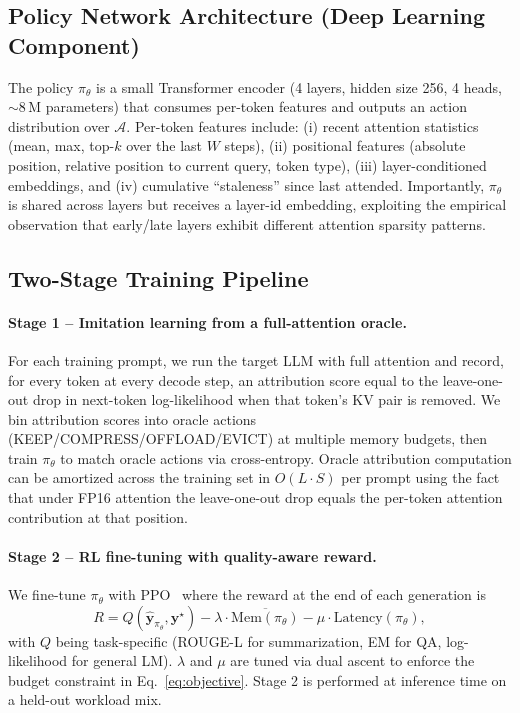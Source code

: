 \documentclass[journal]{IEEEtran}
\begin{document}
\subsection{Policy Network Architecture (Deep Learning Component)}
The policy $\pi_\theta$ is a small Transformer encoder (4 layers, hidden size 256, 4 heads, $\sim 8$\,M parameters) that consumes per-token features and outputs an action distribution over $\mathcal{A}$. Per-token features include: (i) recent attention statistics (mean, max, top-$k$ over the last $W$ steps), (ii) positional features (absolute position, relative position to current query, token type), (iii) layer-conditioned embeddings, and (iv) cumulative ``staleness'' since last attended. Importantly, $\pi_\theta$ is shared across layers but receives a layer-id embedding, exploiting the empirical observation that early/late layers exhibit different attention sparsity patterns.

\subsection{Two-Stage Training Pipeline}
\paragraph{Stage 1 -- Imitation learning from a full-attention oracle.} For each training prompt, we run the target LLM with full attention and record, for every token at every decode step, an attribution score equal to the leave-one-out drop in next-token log-likelihood when that token's KV pair is removed. We bin attribution scores into oracle actions (KEEP/COMPRESS/OFFLOAD/EVICT) at multiple memory budgets, then train $\pi_\theta$ to match oracle actions via cross-entropy. Oracle attribution computation can be amortized across the training set in $O(L \cdot S)$ per prompt using the fact that under FP16 attention the leave-one-out drop equals the per-token attention contribution at that position.

\paragraph{Stage 2 -- RL fine-tuning with quality-aware reward.} We fine-tune $\pi_\theta$ with PPO~\cite{schulman2017ppo} where the reward at the end of each generation is
\begin{equation}
R = Q(\hat{\mathbf{y}}_{\pi_\theta},\mathbf{y}^\star) - \lambda \cdot \overline{\mathrm{Mem}(\pi_\theta)} - \mu\cdot \mathrm{Latency}(\pi_\theta),
\label{eq:reward}
\end{equation}
with $Q$ being task-specific (ROUGE-L for summarization, EM for QA, log-likelihood for general LM). $\lambda$ and $\mu$ are tuned via dual ascent to enforce the budget constraint in Eq.~\ref{eq:objective}. Stage 2 is performed at inference time on a held-out workload mix.
\end{document}
